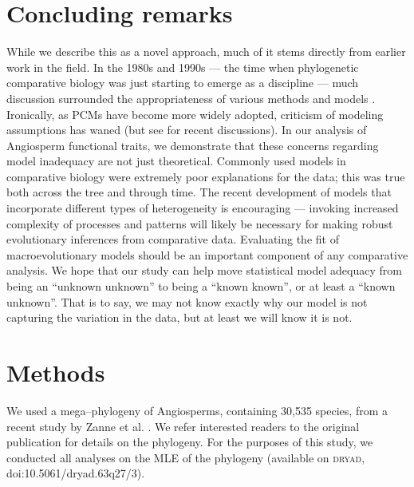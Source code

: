\documentclass[a4paper,12pt]{article}
\begin{document}
\section{Concluding remarks}
While we describe this as a novel approach, much of it stems directly from earlier work in the field. In the 1980s and 1990s --- the time when phylogenetic comparative biology was just starting to emerge as a discipline --- much discussion surrounded the appropriateness of various methods and models \citep{Felsenstein1985, Felsenstein1988, HarveyPagel1991, Garland1992, Pagel1993, Diaz1996, Price1997, Garland1999, GarlandIves2000}. Ironically, as PCMs have become more widely adopted, criticism of modeling assumptions has waned (but see \citep{Felsenstein2012, Hansen2012} for recent discussions). In our analysis of Angiosperm functional traits, we demonstrate that these concerns regarding model inadequacy are not just theoretical. Commonly used models in comparative biology were extremely poor explanations for the data; this was true both across the tree and through time. The recent development of models that incorporate different types of heterogeneity is encouraging --- invoking increased complexity of processes and patterns will likely be necessary for making robust evolutionary inferences from comparative data. Evaluating the fit of macroevolutionary models should be an important component of any comparative analysis. We hope that our study can help move statistical model adequacy from being an ``unknown unknown''  to being a ``known known'', or at least a ``known unknown''. That is to say, we may not know exactly why our model is not capturing the variation in the data, but at least we will know it is not.

\section{Methods}

We used a mega--phylogeny of Angiosperms, containing 30,535 species, from a recent study by Zanne et al. \citep{Zanne2013}. We refer interested readers to the original publication \citep{Zanne2013} for details on the phylogeny. For the purposes of this study, we conducted all analyses on the MLE of the phylogeny (available on \textsc{dryad}, doi:10.5061/dryad.63q27/3).
\end{document}

